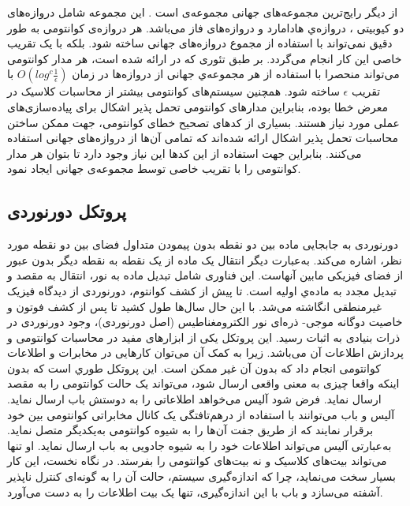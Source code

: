 از دیگر رایج‌ترین مجموعه‌های جهانی مجموعه‌ی  است \cite{ross}. این مجموعه شامل دروازه‌های دو کیوبیتی ، دروازه‌ي هادامارد و دروازه‌های فاز می‌باشد. هر دروازه‌ی کوانتومی به طور دقیق نمی‌تواند با استفاده از مجموع دروازه‌های جهانی ساخته شود. بلکه با یک تقریب خاصی این کار انجام می‌گردد. بر طبق تئوری  که در\cite{dawson2005solovay} ارائه شده است، هر مدار کوانتومی می‌تواند منحصرا با استفاده از هر مجموعه‌ي جهانی از دروازه‌ها در زمان $O(log^{c} \frac{1}{\epsilon})$ با تقریب $\epsilon$ ساخته شود. همچنین سیستم‌های کوانتومی بیشتر از محاسبات کلاسیک در معرض خطا بوده، بنابراین مدارهای کوانتومی تحمل پذیر اشکال برای پیاده‌سازی‌های عملی مورد نیاز هستند. بسیاری از کدهای تصحیح خطای کوانتومی\cite{steane1996error,bacon2006operator,houshmand2012minimal}، جهت ممکن ساختن محاسبات تحمل پذیر اشکال ارائه شده‌اند که تمامی آن‌ها از دروازه‌های جهانی استفاده می‌کنند\cite{kliuchnikov2013synthesis}. بنابراین جهت استفاده از این کدها این نیاز وجود دارد تا بتوان هر مدار کوانتومی را با تقریب خاصی توسط مجموعه‌ی جهانی ایجاد نمود. 



\subsection{پروتکل دورنوردی}
دورنوردی به جابجایی ماده بین دو نقطه بدون پیمودن متداول فضای بین دو نقطه مورد نظر، اشاره می‌کند. به‌عبارت دیگر انتقال یک ماده از یک نقطه به نقطه دیگر بدون عبور از فضای فیزیکی مابین آنهاست. این فناوری شامل تبدیل ماده به نور، انتقال به مقصد و تبدیل مجدد به ماده‌ي اولیه است. تا پیش از کشف کوانتوم، دورنوردی از دیدگاه فیزیک غیرمنطقی انگاشته می‌شد. با این حال سال‌ها طول کشید تا پس از کشف فوتون و خاصیت دوگانه موجی- ذره‌ای نور الکترو‌مغناطیس (اصل دورنوردی)، وجود دورنوردی در ذرات بنیادی به اثبات رسید\cite{furusawa1998unconditional,bouwmeester1997experimental,metcalf2014quantum}.
 این پروتکل یکی از ابزارهای مفید در محاسبات کوانتومی و پردازش اطلاعات آن می‌باشد. زیرا به کمک آن می‌توان کارهایی در مخابرات و اطلاعات کوانتومی انجام داد که بدون آن غیر ممکن است. اين پروتكل طوري است  که بدون اینکه واقعا چیزی به معنی واقعی ارسال شود، می‌تواند یک حالت کوانتومی را به مقصد ارسال نماید. فرض شود آلیس می‌خواهد اطلاعاتی را به دوستش باب ارسال نماید.  آلیس و باب می‌توانند با استفاده از درهم‌تافتگی یک کانال مخابراتی کوانتومی بین خود برقرار نمایند که از طریق جفت  آن‌ها را به شیوه کوانتومی به‌یکدیگر متصل نماید. به‌عبارتی آلیس می‌تواند اطلاعات خود را به شیوه جادویی به باب ارسال نماید. او تنها می‌تواند بیت‌های کلاسیک و نه بیت‌های کوانتومی را بفرستد. در نگاه نخست، این کار بسیار سخت می‌نماید، چرا که اندازه‌گیری سیستم، حالت آن را به گونه‌ای کنترل ناپذیر آشفته می‌سازد و باب  با این اندازه‌گیری، تنها یک بیت اطلاعات را به دست می‌آورد.

